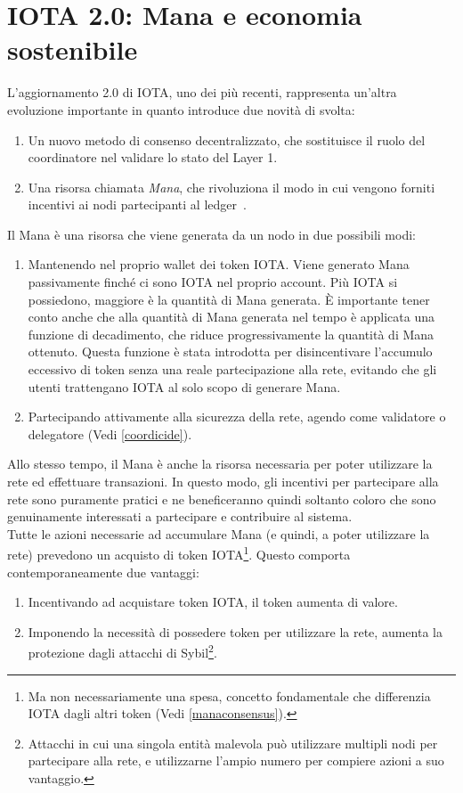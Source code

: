 \documentclass[12pt,a4paper,openright,twoside]{report}
\begin{document}
\section{IOTA 2.0: Mana e economia sostenibile}
L'aggiornamento 2.0 di IOTA, uno dei più recenti, rappresenta un'altra evoluzione importante in quanto introduce due novità di svolta:
\begin{enumerate}
    \item Un nuovo metodo di consenso decentralizzato, che sostituisce il ruolo del coordinatore nel validare lo stato del Layer 1.
    \item Una risorsa chiamata \textit{Mana}, che rivoluziona il modo in cui vengono forniti incentivi ai nodi partecipanti al ledger~\cite{iota20}.
\end{enumerate} 
Il Mana è una risorsa che viene generata da un nodo in due possibili modi:
\begin{enumerate}
    \item Mantenendo nel proprio wallet dei token IOTA. Viene generato Mana passivamente finché ci sono IOTA nel proprio account. Più IOTA si possiedono, maggiore è la quantità di Mana generata. È importante tener conto anche che alla quantità di Mana generata nel tempo è applicata una funzione di decadimento, che riduce progressivamente la quantità di Mana ottenuto. Questa funzione è stata introdotta per disincentivare l'accumulo eccessivo di token senza una reale partecipazione alla rete, evitando che gli utenti trattengano IOTA al solo scopo di generare Mana.
    \item Partecipando attivamente alla sicurezza della rete, agendo come validatore o delegatore  (Vedi \ref{coordicide}).
\end{enumerate}
Allo stesso tempo, il Mana è anche la risorsa necessaria per poter utilizzare la rete ed effettuare transazioni. In questo modo, gli incentivi per partecipare alla rete sono puramente pratici e ne beneficeranno quindi soltanto coloro che sono genuinamente interessati a partecipare e contribuire al sistema.\\
Tutte le azioni necessarie ad accumulare Mana (e quindi, a poter utilizzare la rete) prevedono un acquisto di token IOTA\footnote{Ma non necessariamente una spesa, concetto fondamentale che differenzia IOTA dagli altri token (Vedi \ref{manaconsensus}).}. Questo comporta contemporaneamente due vantaggi:
\begin{enumerate}
    \item Incentivando ad acquistare token IOTA, il token aumenta di valore.
    \item Imponendo la necessità di possedere token per utilizzare la rete, aumenta la protezione dagli attacchi di Sybil\footnote{Attacchi in cui una singola entità malevola può utilizzare multipli nodi per partecipare alla rete, e utilizzarne l'ampio numero per compiere azioni a suo vantaggio.}.
\end{enumerate}
\end{document}
